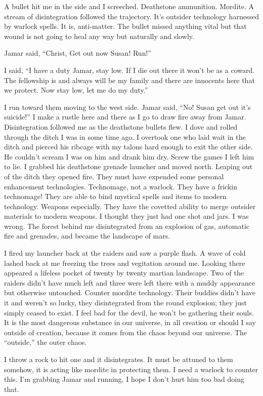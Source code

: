 A bullet hit me in the side and I screeched. Deathstone ammunition. Mordite. A stream of disintegration followed the trajectory. It's outsider technology harnessed by warlock spells. It is, anti-matter. The bullet missed anything vital but that wound is not going to heal any way but naturally and slowly.

Jamar said, ``Christ, Get out now Susan! Run!''

I said, ``I have a duty Jamar, stay low. If I die out there it won't be as a coward. The fellowship is and always will be my family and there are innocents here that we protect. Now stay low, let me do my duty.''

I run toward them moving to the west side. Jamar said, ``No! Susan get out it's suicide!'' I make a rustle here and there as I go to draw fire away from Jamar. Disintegration followed me as the deathstone bullets flew. I dove and rolled through the ditch I was in some time ago. I overtook one who laid wait in the ditch and pierced his ribcage with my talons hard enough to exit the other side. He couldn't scream I was on him and drank him dry. Screw the games I left him to lie. I grabbed his deathstone grenade launcher and moved north. Leaping out of the ditch they opened fire. They must have expended some personal enhancement technologies. Technomage, not a warlock. They have a frickin technomage! They are able to bind mystical spells and items to modern technology. Weapons especially. They have the covetted ability to merge outsider materials to modern weapons. I thought they just had one shot and jars. I was wrong. The forest behind me disintegrated from an explosion of gas, automatic fire and grenades, and became the landscape of mars.

I fired my launcher back at the raiders and saw a purple flash. A wave of cold lashed back at me freezing the trees and vegitation around me. Looking there appeared a lifeless pocket of twenty by twenty martian landscape. Two of the raiders didn't have much left and three were left there with a muddy appearance but otherwise untouched. Counter mordite technology. Their buddies didn't have it and weren't so lucky, they disintegrated from the round explosion; they just simply ceased to exist. I feel bad for the devil, he won't be gathering their souls. It is the most dangerous substance in our universe, in all creation or should I say outside of creation, because it comes from the chaos beyond our universe. The ``outside,'' the outer chaos.

I throw a rock to hit one and it disintegrates. It must be attuned to them somehow, it is acting like mordite in protecting them. I need a warlock to counter this. I'm grabbing Jamar and running, I hope I don't hurt him too bad doing that.

